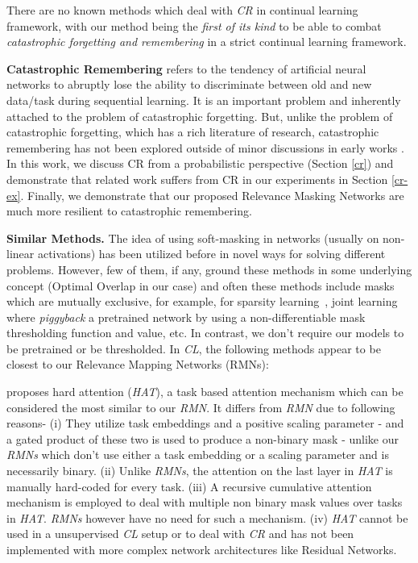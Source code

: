 \documentclass{article}
\begin{document}
There are no known methods which deal with \textit{CR} in continual learning framework, with our method being the \textit{first of its kind} to be able to combat \textit{catastrophic forgetting and remembering} in a strict continual learning framework.

\textbf{Catastrophic Remembering} refers to the tendency of artificial neural networks to abruptly lose the ability to discriminate between old and new data/task during sequential learning. It is an important problem and inherently attached to the problem of catastrophic  forgetting. But, unlike the problem of catastrophic forgetting, which has a rich literature of research, catastrophic remembering has not been explored 
outside of minor discussions in early works \cite{shark95, LEWANDOWSKY1995329, French1991}. In this work, we discuss CR from a probabilistic perspective (Section \ref{cr}) and demonstrate that related work suffers from CR in our experiments in Section \ref{cr-ex}. Finally, we demonstrate that our proposed Relevance Masking Networks are much more resilient to catastrophic remembering.

\textbf{Similar Methods.}\label{sim_meth}
The idea of using soft-masking in networks (usually on non-linear activations) has been utilized before in novel ways for solving different problems. However, few of them, if any, ground these methods in some underlying concept (Optimal Overlap in our case) and often these methods include masks which are mutually exclusive, for example, for sparsity learning~\cite{zhu2017prune}, joint learning~\cite{mallya} where \textit{piggyback} a pretrained network by using a non-differentiable mask thresholding function and value, etc. In contrast, we don’t require our models to be pretrained or be thresholded. In \textit{CL}, the following methods appear to be closest to our Relevance Mapping Networks (RMNs): 


\cite{Serr2018OvercomingCF} proposes hard attention (\textit{HAT}), a task based attention mechanism which can be considered the most similar to our \textit{RMN}. It differs from \textit{RMN} due to following reasons- 
(i) They utilize task embeddings and a positive scaling parameter - and a gated product of these two is used to produce a non-binary mask - unlike our \textit{RMNs} which don't use either a task embedding or a scaling parameter and is necessarily binary.
(ii) Unlike \textit{RMNs}, the attention on the last layer in \textit{HAT} is manually hard-coded for every task.
(iii) A recursive cumulative attention mechanism is employed to deal with multiple non binary mask values over tasks in \textit{HAT}. \textit{RMNs} however have no need for such a mechanism.
(iv) \textit{HAT} cannot be used in a unsupervised \textit{CL} setup or to deal with \textit{CR} and has not been implemented with more complex network architectures like Residual Networks.
\end{document}
